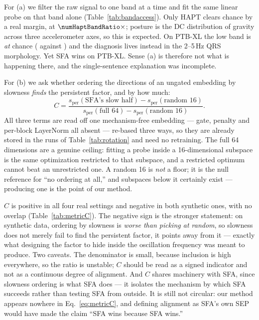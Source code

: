 For (a) we filter the raw signal to one band at a time and fit the same linear probe on that band alone (Table~\ref{tab:bandaccess}). Only HAPT clears chance by a real margin, at $\numHaptBandRatio\times$; posture is the DC distribution of gravity across three accelerometer axes, so this is expected. On PTB-XL the low band is \emph{at} chance (\numPtbLowBand{} against \numPtbChance) and the diagnosis lives instead in the 2--5\,Hz QRS morphology. Yet SFA wins on PTB-XL. Sense (a) is therefore not what is happening there, and the single-sentence explanation was incomplete.



For (b) we ask whether ordering the directions of an ungated embedding by slowness \emph{finds} the persistent factor, and by how much:
\begin{equation}
C=\frac{s_{\text{per}}(\text{SFA's slow half}) - s_{\text{per}}(\text{random 16})}
       {s_{\text{per}}(\text{full 64}) - s_{\text{per}}(\text{random 16})}.
\label{eq:metricC}
\end{equation}
All three terms are read off one mechanism-free embedding --- gate, penalty and per-block LayerNorm all absent --- re-based three ways, so they are already stored in the runs of Table~\ref{tab:rotation} and need no retraining. The full 64 dimensions are a genuine ceiling: fitting a probe inside a 16-dimensional subspace is the same optimization restricted to that subspace, and a restricted optimum cannot beat an unrestricted one. A random 16 is \emph{not} a floor; it is the null reference for ``no ordering at all,'' and subspaces below it certainly exist --- producing one is the point of our method.



$C$ is positive in all four real settings and negative in both synthetic ones, with no overlap (Table~\ref{tab:metricC}). The negative sign is the stronger statement: on synthetic data, ordering by slowness is \emph{worse than picking at random}, so slowness does not merely fail to find the persistent factor, it points away from it --- exactly what designing the factor to hide inside the oscillation frequency was meant to produce. Two caveats. The denominator is small, because inclusion is high everywhere, so the ratio is unstable; $C$ should be read as a signed indicator and not as a continuous degree of alignment. And $C$ shares machinery with SFA, since slowness ordering is what SFA does --- it isolates the mechanism by which SFA succeeds rather than testing SFA from outside. It is still not circular: our method appears nowhere in Eq.~\ref{eq:metricC}, and defining alignment as SFA's own SEP would have made the claim ``SFA wins because SFA wins.''

